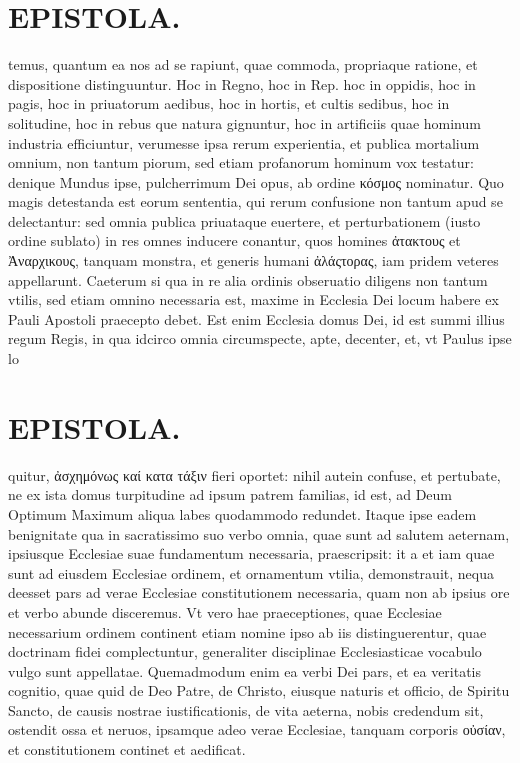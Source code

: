 \documentclass{article}
\begin{document}
\begin{pages}
\section*{EPISTOLA. }\pstart temus, quantum ea nos ad se rapiunt, quae commoda, propriaque ratione, et dispositione distinguuntur. Hoc in Regno, hoc in Rep. hoc in oppidis, hoc in pagis, hoc in priuatorum aedibus, hoc in hortis, et cultis sedibus, hoc in solitudine, hoc in rebus que natura gignuntur, hoc in artificiis quae hominum industria efficiuntur, verumesse ipsa rerum experientia, et publica mortalium omnium, non tantum piorum, sed etiam profanorum hominum vox testatur: denique Mundus ipse, pulcherrimum Dei opus, ab ordine κόσμος nominatur. Quo magis detestanda est eorum sententia, qui rerum confusione non tantum apud se delectantur: sed omnia publica priuataque euertere, et perturbationem (iusto ordine sublato) in res omnes inducere conantur, quos homines ἀτακτους et Ἀναρχικους, tanquam monstra, et generis humani ἀλάςτορας, iam pridem veteres appellarunt. Caeterum si qua in re alia ordinis obseruatio diligens non tantum vtilis, sed etiam omnino necessaria est, maxime in Ecclesia Dei locum habere ex Pauli Apostoli praecepto debet. Est enim Ecclesia domus Dei, id est summi illius regum Regis, in qua idcirco omnia circumspecte, apte, decenter, et, vt Paulus ipse lo\pend
\section*{EPISTOLA. }\pstart quitur, ἀσχημόνως καί κατα τάξιν fieri oportet: nihil autein confuse, et pertubate, ne ex ista domus turpitudine ad ipsum patrem familias, id est, ad Deum Optimum Maximum aliqua labes quodammodo redundet. Itaque ipse eadem benignitate qua in sacratissimo suo verbo omnia, quae sunt ad salutem aeternam, ipsiusque Ecclesiae suae fundamentum necessaria, praescripsit: it a et iam quae sunt ad eiusdem Ecclesiae ordinem, et ornamentum vtilia, demonstrauit, nequa deesset pars ad verae Ecclesiae constitutionem necessaria, quam non ab ipsius ore et verbo abunde disceremus. Vt vero hae praeceptiones, quae Ecclesiae necessarium ordinem continent etiam nomine ipso ab iis distinguerentur, quae doctrinam fidei complectuntur, generaliter disciplinae Ecclesiasticae vocabulo vulgo sunt appellatae. Quemadmodum enim ea verbi Dei pars, et ea veritatis cognitio, quae quid de Deo Patre, de Christo, eiusque naturis et officio, de Spiritu Sancto, de causis nostrae iustificationis, de vita aeterna, nobis credendum sit, ostendit ossa et neruos, ipsamque adeo verae Ecclesiae, tanquam corporis οὐσίαν, et constitutionem continet et aedificat.  \pend

\end{pages}
\end{document}
